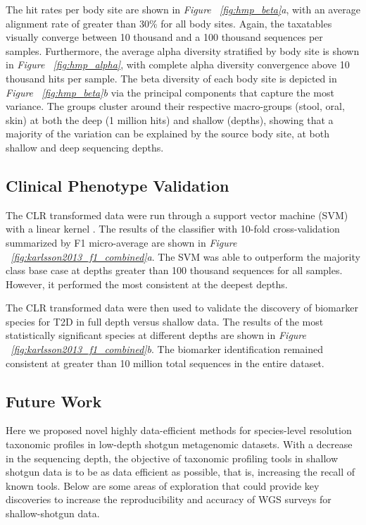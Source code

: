 The hit rates per body site are shown in \textit{Figure ~\ref{fig:hmp_beta}a}, with an average alignment rate of greater than 30\% for all body sites. Again, the taxatables visually converge between 10 thousand and a 100 thousand sequences per samples. Furthermore, the average alpha diversity stratified by body site is shown in \textit{Figure ~\ref{fig:hmp_alpha}}, with complete alpha diversity convergence above 10 thousand hits per sample. The beta diversity of each body site is depicted in \textit{Figure ~\ref{fig:hmp_beta}b} via the principal components that capture the most variance. The groups cluster around their respective macro-groups (stool, oral, skin) at both the deep (1 million hits) and shallow (depths), showing that a majority of the variation can be explained by the source body site, at both shallow and deep sequencing depths.

\subsection{Clinical Phenotype Validation}

The CLR transformed data were run through a support vector machine (SVM) with a linear kernel \cite{suykens_least_1999}. The results of the classifier with 10-fold cross-validation summarized by F1 micro-average are shown in \textit{Figure ~\ref{fig:karlsson2013_f1_combined}a}. The SVM was able to outperform the majority class base case at depths greater than 100 thousand sequences for all samples. However, it performed the most consistent at the deepest depths.

The CLR transformed data were then used to validate the discovery of biomarker species for T2D in full depth versus shallow data. The results of the most statistically significant species at different depths are shown in \textit{Figure ~\ref{fig:karlsson2013_f1_combined}b}. The biomarker identification remained consistent at greater than 10 million total sequences in the entire dataset.

\subsection{Future Work}

Here we proposed novel highly data-efficient methods for species-level resolution taxonomic profiles in low-depth shotgun metagenomic datasets. With a decrease in the sequencing depth, the objective of taxonomic profiling tools in shallow shotgun data is to be as data efficient as possible, that is, increasing the recall of known tools. Below are some areas of exploration that could provide key discoveries to increase the reproducibility and accuracy of WGS surveys for shallow-shotgun data.

